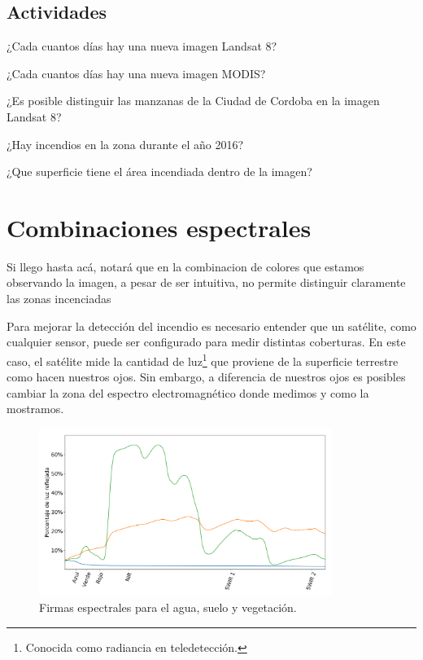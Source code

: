 \documentclass[a4paper,12pt]{book}
\begin{document}
\section{Actividades}
\begin{que}
    ¿Cada cuantos días hay una nueva imagen Landsat 8?
\end{que}
\begin{que}
    ¿Cada cuantos días hay una nueva imagen MODIS?
\end{que}
\begin{que}
    ¿Es posible distinguir las manzanas de la Ciudad de Cordoba en la imagen Landsat 8?
\end{que}
\begin{que}
    ¿Hay incendios en la zona durante el año 2016?
\end{que}
\begin{que}
    ¿Que superficie tiene el área incendiada dentro de la imagen?
\end{que}

\chapter{Combinaciones espectrales}
Si llego hasta acá, notará que en la combinacion de colores que estamos observando la imagen, a pesar de ser intuitiva, no permite distinguir claramente las zonas incenciadas

Para mejorar la detección del incendio es necesario entender que un satélite, como cualquier sensor, puede ser configurado para medir distintas coberturas. En este caso, el satélite mide la cantidad de luz\footnote{Conocida como radiancia en teledetección.} que proviene de la superficie terrestre como hacen nuestros ojos. Sin embargo, a diferencia de nuestros ojos es posibles cambiar la zona del espectro electromagnético donde medimos y como la mostramos.

\begin{figure}[h!]
    \centering
    \includegraphics[width=0.85\textwidth]{fig:spec.png}
    \caption{Firmas espectrales para el agua, suelo y vegetación.}
    \label{fig:spec}
\end{figure}
\end{document}
